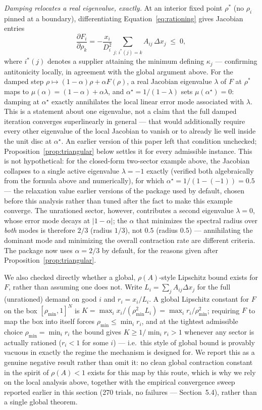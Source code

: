 \documentclass[11pt]{article}
\begin{document}
\emph{Damping relocates a real eigenvalue, exactly.} At an interior
fixed point $\rho^*$ (no $\rho_i$ pinned at a boundary), differentiating
Equation~\eqref{eq:rationing} gives Jacobian entries
\begin{equation}
  \frac{\partial F_i}{\partial\rho_k} =
  -\frac{x_i}{D_i^2}\sum_{j:\,i^*(j)=k} A_{ij}\,\Delta x_j \;\le\; 0,
\end{equation}
where $i^*(j)$ denotes a supplier attaining the minimum defining
$\kappa_j$ --- confirming antitonicity locally, in agreement with the
global argument above. For the damped step $\rho\mapsto(1-\alpha)\rho+
\alpha F(\rho)$, a real Jacobian eigenvalue $\lambda$ of $F$ at $\rho^*$
maps to $\mu(\alpha)=(1-\alpha)+\alpha\lambda$, and
$\alpha^\star=1/(1-\lambda)$ sets $\mu(\alpha^\star)=0$: damping at
$\alpha^\star$ exactly annihilates the local linear error mode
associated with $\lambda$. This is a statement about one eigenvalue, not
a claim that the full damped iteration converges superlinearly in
general --- that would additionally require every other eigenvalue of
the local Jacobian to vanish or to already lie well inside the unit
disc at $\alpha^\star$. An earlier version of this paper left that
condition unchecked; Proposition~\ref{prop:triangular} below settles it
for every admissible instance. This is not hypothetical: for the closed-form
two-sector example above, the Jacobian collapses to a single active
eigenvalue $\lambda=-1$ exactly (verified both algebraically from the
formula above and numerically), for which
$\alpha^\star=1/(1-(-1))=0.5$ --- the relaxation value earlier versions
of the package used by default, chosen before this analysis rather than
tuned after the fact to make this example converge. The unrationed
sector, however, contributes a second eigenvalue $\lambda=0$, whose
error mode decays at $|1-\alpha|$; the $\alpha$ that minimizes the
spectral radius over \emph{both} modes is therefore $2/3$ (radius
$1/3$), not $0.5$ (radius $0.5$) --- annihilating the dominant mode and
minimizing the overall contraction rate are different criteria. The
package now uses $\alpha=2/3$ by default, for the reasons given after
Proposition~\ref{prop:triangular}.

We also checked directly whether a global, $\rho(A)$-style Lipschitz
bound exists for $F$, rather than assuming one does not. Write
$L_i=\sum_jA_{ij}\Delta x_j$ for the full (unrationed) demand on
good $i$ and $r_i=x_i/L_i$. A global Lipschitz constant for $F$ on the
box $[\rho_{\min},1]^N$ is $K=\max_ix_i/(\rho_{\min}^2L_i)=\max_ir_i/
\rho_{\min}^2$; requiring $F$ to map the box into itself forces
$\rho_{\min}\le\min_ir_i$, and at the tightest admissible choice
$\rho_{\min}=\min_ir_i$ the bound gives $K\ge1/\min_ir_i>1$ whenever any
sector is actually rationed ($r_i<1$ for some $i$) --- i.e.\ this style
of global bound is provably vacuous in exactly the regime the mechanism
is designed for. We report this as a genuine negative result rather
than omit it: no clean global contraction constant in the spirit of
$\rho(A)<1$ exists for this map by this route, which is why we rely on
the local analysis above, together with the empirical convergence sweep
reported earlier in this section (270 trials, no failures --- Section~5.4),
rather than a single global theorem.
\end{document}
